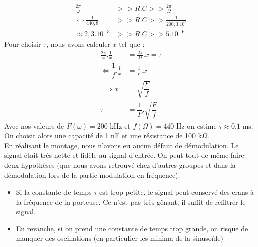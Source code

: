 \documentclass[12pt,a4paper]{article}
\begin{document}
\begin{enumerate}
\begin{align*}
\frac{2\pi}{\omega}&>> R.C >>  \frac{2\pi}{\Omega}\\
\iff \frac{1}{440,8}&>> R.C >>  \frac{1}{200,3.10^3}\\
\approx 2,3.10^{-3}&>>R.C>>5.10^{-6}
\end{align*}
Pour choisir $\tau$, nous avons calculer $x$ tel que :
\begin{align*}
\frac{2\pi}{\omega}.\frac{1}{x}&=\frac{2\pi}{\Omega}.x=\tau\\
\iff \dfrac{1}{f}.\frac{1}{x} &=\frac{1}{F}.x\\
\implies x&=\sqrt{\dfrac{F}{f}}\\
\tau&=\dfrac{1}{F}.\sqrt{\dfrac{F}{f}}
\end{align*} 
Avec  nos valeurs de $F(\omega) = 200$ kHz et $f(\Omega) = 440 $ Hz on estime $\tau \approx 0.1$ ms.
On choisit alors une capacité de 1 nF et une résistance de 100 k$\Omega$.\\

En réalisant le montage, nous n'avons eu aucun défaut de démodulation. Le signal était très nette et fidèle au signal d'entrée. On peut tout de même faire deux hypothèses (que nous avons retrouvé chez d'autres groupes et dans la démodulation lors de la partie modulation en fréquence).
\begin{itemize}
\item Si la constante de temps $\tau$ est trop petite, le signal peut conservé des crans à la fréquence de la porteuse. Ce n'est pas très gênant, il suffit de refiltrer le signal.
\item En revanche, si on prend une constante de temps trop grande, on risque de manquer des oscillations (en particulier les minima de la sinusoïde)
\end{itemize}
\end{enumerate}
\end{document}
